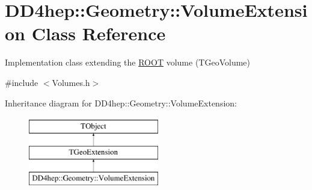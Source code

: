 \hypertarget{class_d_d4hep_1_1_geometry_1_1_volume_extension}{}\section{D\+D4hep\+:\+:Geometry\+:\+:Volume\+Extension Class Reference}
\label{class_d_d4hep_1_1_geometry_1_1_volume_extension}


Implementation class extending the \hyperlink{namespace_r_o_o_t}{R\+O\+OT} volume (T\+Geo\+Volume)  




{\ttfamily \#include $<$Volumes.\+h$>$}

Inheritance diagram for D\+D4hep\+:\+:Geometry\+:\+:Volume\+Extension\+:\begin{figure}[H]
\begin{center}
\leavevmode
\includegraphics[height=3.000000cm]{class_d_d4hep_1_1_geometry_1_1_volume_extension}
\end{center}
\end{figure}
